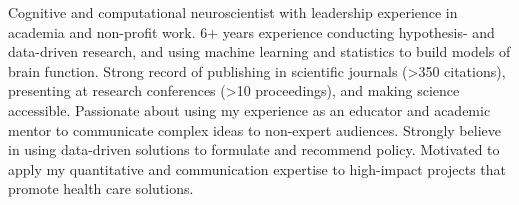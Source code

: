 

\begin{cvparagraph}

Cognitive and computational neuroscientist with leadership experience in academia and non-profit work. 6+ years experience conducting hypothesis- and data-driven research, and using machine learning and statistics to build models of brain function. Strong record of publishing in scientific journals (>350 citations), presenting at research conferences (>10 proceedings), and making science accessible. Passionate about using my experience as an educator and academic mentor to communicate complex ideas to non-expert audiences. Strongly believe in using data-driven solutions to formulate and recommend policy. Motivated to apply my quantitative and communication expertise to high-impact projects that promote health care solutions. 

\end{cvparagraph}
